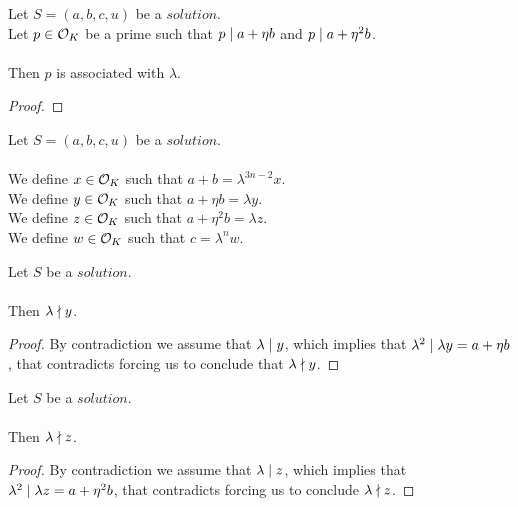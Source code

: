 \begin{lemma}
    \label{lmm:associated_of_dvd_a_add_eta_mul_b_of_dvd_a_add_eta_sq_mul_b}
    \leanok
    Let $S=(a, b, c, u)$ be a $solution$.\\
    Let $p \in \mathcal{O}_K$ be a prime such that $p \mid a+\eta  b$
    and $p \mid a+\eta^2  b$.\\\\
    Then $p$ is associated with $\lambda$.
\end{lemma}
\begin{proof}
    \leanok
\end{proof}

\begin{definition}[$x,y,z,w$]
    \label{def:Solution_x_y_z_w}
    \leanok
    Let $S=(a, b, c, u)$ be a $solution$.\\\\
    We define $x \in \mathcal{O}_K$ such that $a + b = \lambda^{3n-2}  x$.\\
    We define $y \in \mathcal{O}_K$ such that $a + \eta  b = \lambda  y$.\\
    We define $z \in \mathcal{O}_K$ such that $a + \eta^2  b = \lambda  z$.\\
    We define $w \in \mathcal{O}_K$ such that $c = \lambda^n  w$.
\end{definition}

\begin{lemma}
    \label{lmm:lambda_not_dvd_y}
    \leanok
    Let $S$ be a $solution$.\\\\
    Then $\lambda \nmid y$.
\end{lemma}
\begin{proof}
    \leanok
    By contradiction we assume that $\lambda \mid y$, which implies that
    $\lambda^2 \mid \lambda y = a + \eta b$, that contradicts
     forcing us to conclude that
    $\lambda \nmid y$.
\end{proof}

\begin{lemma}
    \label{lmm:lambda_not_dvd_z}
    \leanok
    Let $S$ be a $solution$.\\\\
    Then $\lambda \nmid z$.
\end{lemma}
\begin{proof}
    \leanok
    By contradiction we assume that $\lambda \mid z$, which implies that
    $\lambda^2 \mid \lambda z = a + \eta^2 b$, that contradicts
     forcing us to conclude $\lambda \nmid z$.
\end{proof}

